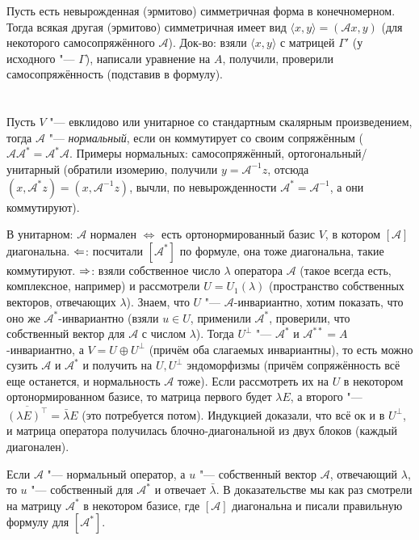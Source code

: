 Пусть есть невырожденная (эрмитово) симметричная форма в конечномерном.
Тогда всякая другая (эрмитово) симметричная имеет вид $\langle x, y \rangle = (\mathcal A x, y)$ (для некоторого самосопряжённого $\mathcal A$).
Док-во: взяли $\langle x, y \rangle$ с матрицей $\Gamma'$ (у исходного "--- $\Gamma$), написали уравнение на $A$, получили, проверили самосопряжённость (подставив в формулу).

\section{} %
Пусть $V$ "--- евклидово или унитарное со стандартным скалярным произведением, тогда $\mathcal A$ "--- \textit{нормальный}, если он коммутирует
со своим сопряжённым ($\mathcal A \mathcal A^* = \mathcal A^* \mathcal A$.
Примеры нормальных: самосопряжённый, ортогональный/унитарный (обратили изомерию, получили $y=\mathcal A^{-1}z$, отсюда $(x, \mathcal A^*z)=(x,\mathcal A^{-1}z)$,
вычли, по невырожденности $\mathcal A^*=\mathcal A^{-1}$, а они коммутируют).

В унитарном: $\mathcal A$ нормален $\iff$ есть ортонормированный базис $V$, в котором $[\mathcal A]$ диагональна.
$\Leftarrow$: посчитали $[\mathcal A^*]$ по формуле, она тоже диагональна, такие коммутируют.
$\Rightarrow$: взяли собственное число $\lambda$ оператора $\mathcal{A}$ (такое всегда есть, комплексное, например) и рассмотрели $U=U_1(\lambda)$ (пространство собственных векторов, отвечающих $\lambda$).
Знаем, что $U$ "--- $\mathcal A$-инвариантно, хотим показать, что оно же $\mathcal A^*$-инвариантно (взяли $u \in U$, применили $\mathcal A^*$, проверили,
что собственный вектор для $\mathcal A$ с числом $\lambda$).
Тогда $U^\bot$ "--- $\mathcal A^*$ и $\mathcal A^{**}=A$-инвариантно, а $V=U \oplus U^\bot$ (причём оба слагаемых инвариантны),
то есть можно сузить $\mathcal A$ и $\mathcal A^*$ и получить на $U, U^\bot$ эндоморфизмы (причём сопряжённость всё еще останется, и нормальность $\mathcal A$ тоже).
Если рассмотреть их на $U$ в некотором ортонормированном базисе, то матрица первого будет $\lambda E$, а второго "--- $\overline{(\lambda E)^\top}=\bar\lambda E$
(это потребуется потом).
Индукцией доказали, что всё ок и в $U^\bot$, и матрица оператора получилась блочно-диагональной из двух блоков (каждый диагонален).

Если $\mathcal A$ "--- нормальный оператор, а $u$ "--- собственный вектор $\mathcal A$, отвечающий $\lambda$, то $u$ "--- собственный для $\mathcal A^*$ и отвечает $\bar\lambda$.
В доказательстве мы как раз смотрели на матрицу $\mathcal A^*$ в некотором базисе, где $[\mathcal A]$ диагональна и писали правильную формулу для $[\mathcal A^*]$.

